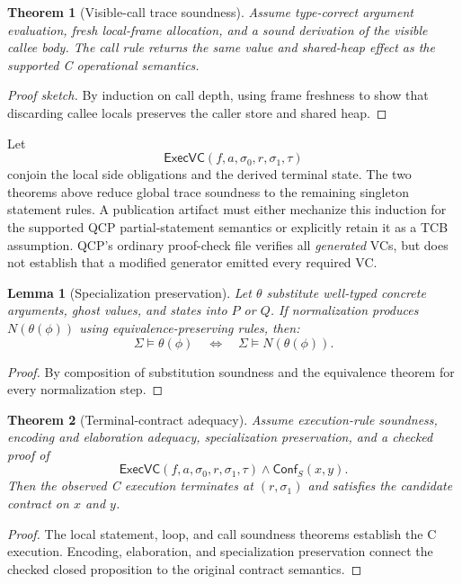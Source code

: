 \documentclass[10pt]{article}
\newtheorem{theorem}{Theorem}
\newtheorem{lemma}{Lemma}
\newcommand{\sat}{\models}
\newcommand{\ctx}{\Sigma}
\begin{document}
\begin{theorem}[Visible-call trace soundness]
Assume type-correct argument evaluation, fresh local-frame allocation, and a
sound derivation of the visible callee body.  The call rule returns the same
value and shared-heap effect as the supported C operational semantics.
\end{theorem}
\begin{proof}[Proof sketch]
By induction on call depth, using frame freshness to show that discarding
callee locals preserves the caller store and shared heap.
\end{proof}

Let
\[
\mathsf{ExecVC}(f,a,\sigma_0,r,\sigma_1,\tau)
\]
conjoin the local side obligations and the derived terminal state.  The two
theorems above reduce global trace soundness to the remaining singleton
statement rules.  A publication artifact must either mechanize this induction
for the supported QCP partial-statement semantics or explicitly retain it as a
TCB assumption.  QCP's ordinary proof-check file verifies all \emph{generated}
VCs, but does not establish that a modified generator emitted every required
VC.

\begin{lemma}[Specialization preservation]
Let $\theta$ substitute well-typed concrete arguments, ghost values, and
states into $P$ or $Q$.  If normalization produces $N(\theta(\phi))$ using
equivalence-preserving rules, then:
\[
\ctx\sat \theta(\phi)
\quad\Longleftrightarrow\quad
\ctx\sat N(\theta(\phi)).
\]
\end{lemma}
\begin{proof}
By composition of substitution soundness and the equivalence theorem for every
normalization step.
\end{proof}

\begin{theorem}[Terminal-contract adequacy]
Assume execution-rule soundness, encoding and elaboration adequacy,
specialization preservation, and a checked
proof of
\[
\mathsf{ExecVC}(f,a,\sigma_0,r,\sigma_1,\tau)
\land \mathsf{Conf}_S(x,y).
\]
Then the observed C execution terminates at $(r,\sigma_1)$ and satisfies the
candidate contract on $x$ and $y$.
\end{theorem}
\begin{proof}
The local statement, loop, and call soundness theorems establish the C
execution.  Encoding, elaboration, and specialization preservation connect the
checked closed proposition to the original contract semantics.
\end{proof}
\end{document}
